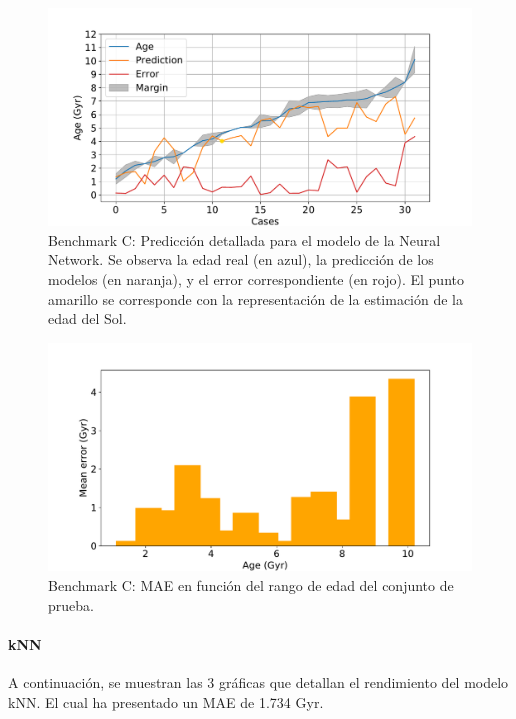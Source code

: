 \begin{figure}[H]
\begin{center}
 \includegraphics[width=0.8\linewidth]{Figuras/Experimentos/B_C_nnet_2.pdf}
\end{center}
\caption{Benchmark C: Predicción detallada para el modelo de la Neural Network. Se observa la edad real (en azul), la predicción de los modelos (en naranja), y el error correspondiente (en rojo). El punto amarillo se corresponde con la representación de la estimación de la edad del Sol.}
 \label{fig:benchC_details_nnet_2}
\end{figure}

\begin{figure}[H]
\begin{center}
 \includegraphics[width=0.8\linewidth]{Figuras/Experimentos/B_C_nnet_3.pdf}
\end{center}
\caption{Benchmark C: MAE en función del rango de edad del conjunto de prueba.}
 \label{fig:benchC_details_nnet_3}
\end{figure}

\paragraph{kNN} 
A continuación, se muestran las 3 gráficas que detallan el rendimiento del modelo kNN. El cual ha presentado un MAE de 1.734 Gyr.

